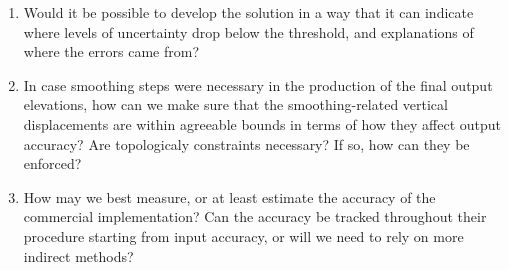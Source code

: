 \begin{enumerate}
\begin{enumerate}
        \item Would it be possible to develop the solution in a way that it can indicate where levels of uncertainty drop below the threshold, and explanations of where the errors came from?
        \item In case smoothing steps were necessary in the production of the final output elevations, how can we make sure that the smoothing-related vertical displacements are within agreeable bounds in terms of how they affect output accuracy? Are topologicaly constraints necessary? If so, how can they be enforced?
        \item How may we best measure, or at least estimate the accuracy of the commercial implementation? Can the accuracy be tracked throughout their procedure starting from input accuracy, or will we need to rely on more indirect methods?
    \end{enumerate}
\end{enumerate}